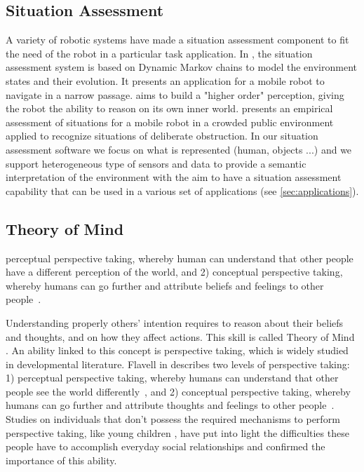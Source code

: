 \subsection{Situation Assessment}
A variety of robotic systems have made a situation assessment component to fit the need of the robot in a particular task application. In \cite{beck2011}, the situation assessment system is based on Dynamic Markov chains to model the environment states and their evolution. It presents an application for a mobile robot to navigate in a narrow passage.
\cite{Chella2010} aims to build a "higher order" perception, giving the robot the ability to reason on its own inner world.
\cite{Kluge01situationassessment} presents an empirical assessment of situations for a mobile robot in a crowded public environment applied to recognize situations of deliberate obstruction. In our situation assessment software we focus on what is represented (human, objects ...) and we support heterogeneous type of sensors and data to provide a semantic interpretation of the environment with the aim to have a situation assessment capability that can be used in a various set of applications (see \ref{sec:applications}).


\subsection{Theory of Mind}
perceptual perspective taking, whereby 
human can understand that other people have a different  perception of the world, and 2) 
conceptual perspective taking, whereby humans can go further and attribute beliefs and feelings to other people~\cite{Baron1985}.

Understanding properly others' intention requires to reason about their beliefs and thoughts, and on how they affect actions. This skill is called Theory of Mind \cite{premack1978does}. An ability linked to this concept is perspective taking, which is widely studied in developmental literature.  Flavell in \cite{flavell1977development} describes two levels of perspective taking: 
1) perceptual perspective taking, whereby  humans can understand that other people see the world differently~\cite{Tversky1999}, and 2) conceptual perspective taking, whereby humans can go further and attribute thoughts and feelings to other people~\cite{Baron1985}. Studies on individuals that don't possess the required mechanisms to perform perspective taking, like young children \cite{frick2014picturing}, 
have put into light the difficulties these people have to accomplish everyday social relationships and confirmed the importance of this ability.

